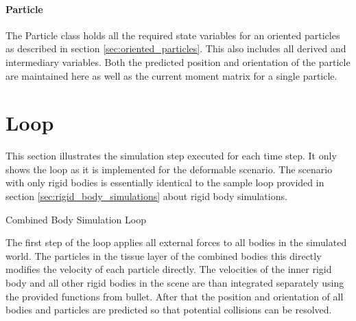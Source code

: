 \paragraph{Particle}
The Particle class holds all the required state variables for an oriented particles as described in section \ref{sec:oriented_particles}. This also includes all derived and intermediary variables. Both the predicted position and orientation of the particle are maintained here as well as the current moment matrix for a single particle.

\section{Loop}

This section illustrates the simulation step executed for each time step. It only shows the loop as it is implemented for the deformable scenario. The scenario with only rigid bodies is essentially identical to the sample loop provided in section \ref{sec:rigid_body_simulations} about rigid body simulations.

\begin{algorithm}[htb!]
\caption{Combined Body Simulation Loop}
\begin{algorithmic}[1]
\ENDFOR
{}
	\ENDFOR
	\ENDFOR
\ENDFOR
{}
		\ENDFOR
	\ENDFOR
\ENDFOR
{}
	\ENDFOR
\ENDFOR
{}
\ENDFOR

\ENDFOR
\end{algorithmic}
\end{algorithm}

The first step of the loop applies all external forces to all bodies in the simulated world. The particles in the tissue layer of the combined bodies this directly modifies the velocity of each particle directly. The velocities of the inner rigid body and all other rigid bodies in the scene are than integrated separately using the provided functions from bullet. After that the position and orientation of all bodies and particles are predicted so that potential collisions can be resolved.

